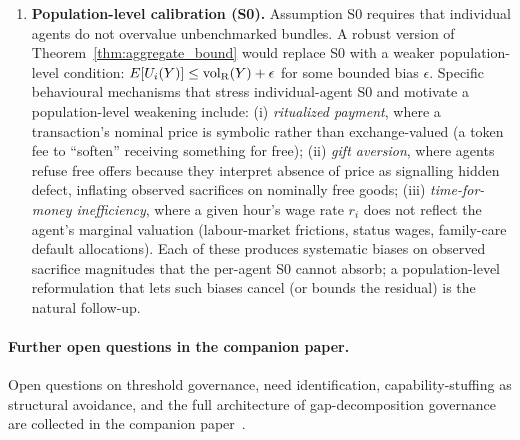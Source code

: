 \begin{enumerate}
\item \label{oq:calibration}
\textbf{Population-level calibration (S0).}
Assumption S0 requires that individual agents do not overvalue
unbenchmarked bundles.  A robust version of
Theorem~\ref{thm:aggregate_bound} would replace S0 with a
weaker population-level condition:
$E[U_i(Y)] \leq {\operatorname{vol}_{\mathrm{R}}}(Y) + \epsilon$ for some bounded bias
$\epsilon$.  Specific behavioural mechanisms that stress
individual-agent S0 and motivate a population-level weakening
include: (i) \emph{ritualized payment}, where a transaction's
nominal price is symbolic rather than exchange-valued (a token
fee to ``soften'' receiving something for free);
(ii) \emph{gift aversion}, where agents refuse free offers
because they interpret absence of price as signalling hidden
defect, inflating observed sacrifices on nominally free goods;
(iii) \emph{time-for-money inefficiency}, where a given hour's
wage rate $r_i$ does not reflect the agent's marginal valuation
(labour-market frictions, status wages, family-care default
allocations).  Each of these produces systematic biases on
observed sacrifice magnitudes that the per-agent S0 cannot
absorb; a population-level reformulation that lets such biases
cancel (or bounds the residual) is the natural follow-up.

\end{enumerate}

\paragraph{Further open questions in the companion
paper.} Open questions on threshold governance, need
identification, capability-stuffing as structural avoidance,
and the full architecture of gap-decomposition governance are
collected in the companion paper~\citep[Need~Sufficiency]{lasser2026paper8b}.
